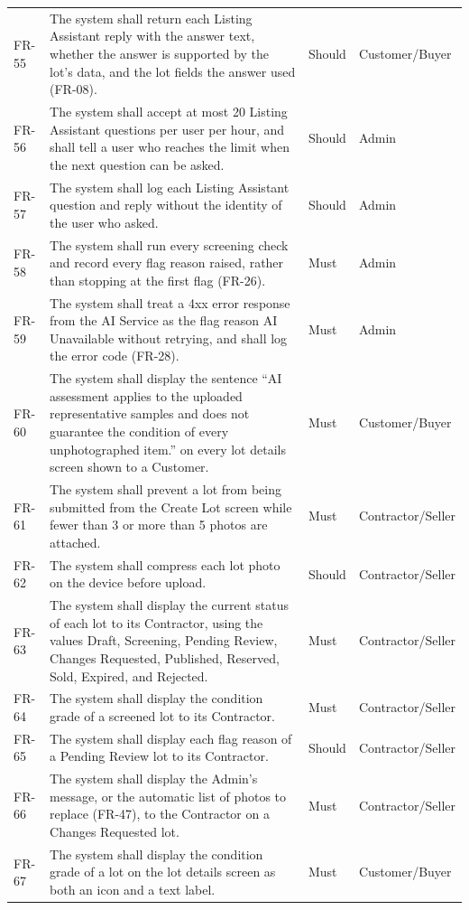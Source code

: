 {\begin{longtable}{@{}p{}p{}p{}p{}@{}}
FR-55 & The system shall return each Listing Assistant reply with the answer text, whether the answer is supported by the lot's data, and the lot fields the answer used (FR-08). & Should & Customer/Buyer \\
FR-56 & The system shall accept at most 20 Listing Assistant questions per user per hour, and shall tell a user who reaches the limit when the next question can be asked. & Should & Admin \\
FR-57 & The system shall log each Listing Assistant question and reply without the identity of the user who asked. & Should & Admin \\
FR-58 & The system shall run every screening check and record every flag reason raised, rather than stopping at the first flag (FR-26). & Must & Admin \\
FR-59 & The system shall treat a 4xx error response from the AI Service as the flag reason AI Unavailable without retrying, and shall log the error code (FR-28). & Must & Admin \\
FR-60 & The system shall display the sentence ``AI assessment applies to the uploaded representative samples and does not guarantee the condition of every unphotographed item.'' on every lot details screen shown to a Customer. & Must & Customer/Buyer \\
FR-61 & The system shall prevent a lot from being submitted from the Create Lot screen while fewer than 3 or more than 5 photos are attached. & Must & Contractor/Seller \\
FR-62 & The system shall compress each lot photo on the device before upload. & Should & Contractor/Seller \\
FR-63 & The system shall display the current status of each lot to its Contractor, using the values Draft, Screening, Pending Review, Changes Requested, Published, Reserved, Sold, Expired, and Rejected. & Must & Contractor/Seller \\
FR-64 & The system shall display the condition grade of a screened lot to its Contractor. & Must & Contractor/Seller \\
FR-65 & The system shall display each flag reason of a Pending Review lot to its Contractor. & Should & Contractor/Seller \\
FR-66 & The system shall display the Admin's message, or the automatic list of photos to replace (FR-47), to the Contractor on a Changes Requested lot. & Must & Contractor/Seller \\
FR-67 & The system shall display the condition grade of a lot on the lot details screen as both an icon and a text label. & Must & Customer/Buyer \\

\end{longtable}}
